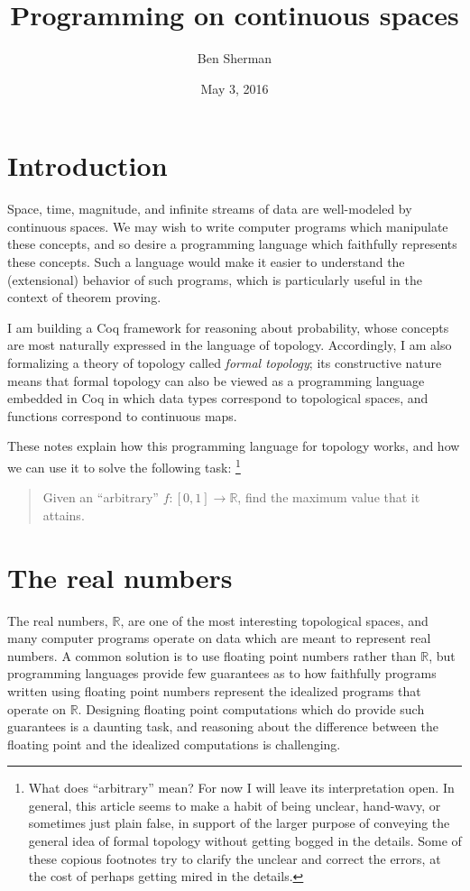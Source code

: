 \documentclass{article}
\title{Programming on continuous spaces}
\author{Ben Sherman}
\date{May 3, 2016}
\newcommand{\R}{\mathbb{R}}
\begin{document}
\maketitle

\section{Introduction}

Space, time, magnitude, and infinite streams of data are well-modeled by continuous spaces. We may wish to write computer programs which manipulate these concepts, and so desire a programming language which faithfully represents these concepts. Such a language would make it easier to understand the (extensional) behavior of such programs, which is particularly useful in the context of theorem proving.

I am building a Coq framework for reasoning about probability, whose concepts are most naturally expressed in the language of topology. Accordingly, I am also formalizing a theory of topology called \emph{formal topology}; its constructive nature means that formal topology can also be viewed as a programming language embedded in Coq in which data types correspond to topological spaces, and functions correspond to continuous maps.

These notes explain how this programming language for topology works, and how we can use it to solve the following task: \footnote{What does ``arbitrary'' mean? For now I will leave its interpretation open. In general, this article seems to make a habit of being unclear, hand-wavy, or sometimes just plain false, in support of the larger purpose of conveying the general idea of formal topology without getting bogged in the details. Some of these copious footnotes try to clarify the unclear and correct the errors, at the cost of perhaps getting mired in the details.}
\begin{quote}
Given an ``arbitrary'' $f : [0,1] \to \R$, find the maximum value that it attains.
\end{quote}

\section{The real numbers}

The real numbers, $\R$, are one of the most interesting topological spaces, and many computer programs operate on data which are meant to represent real numbers. A common solution is to use floating point numbers rather than $\R$, but programming languages provide few guarantees as to how faithfully programs written using floating point numbers represent the idealized programs that operate on $\R$. Designing floating point computations which do provide such guarantees is a daunting task, and reasoning about the difference between the floating point and the idealized computations is challenging.
\end{document}
